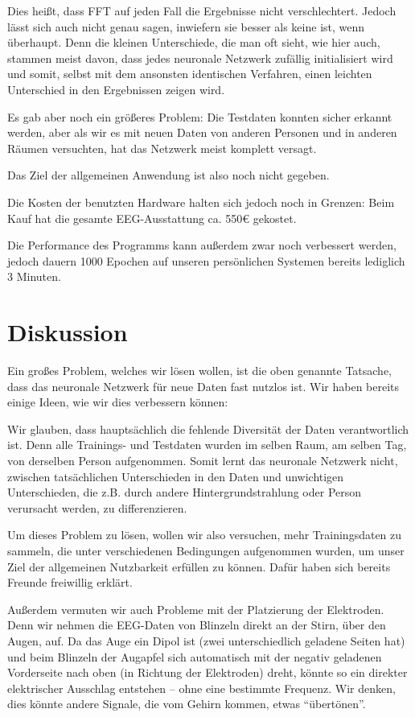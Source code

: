 \documentclass{scrartcl}
\begin{document}
	Dies heißt, dass FFT auf jeden Fall die Ergebnisse nicht verschlechtert. Jedoch lässt sich auch nicht genau sagen, inwiefern sie besser als keine ist, wenn überhaupt. Denn die kleinen Unterschiede, die man oft sieht, wie hier auch, stammen meist davon, dass jedes neuronale Netzwerk zufällig initialisiert wird und somit, selbst mit dem ansonsten identischen Verfahren, einen leichten Unterschied in den Ergebnissen zeigen wird.

	Es gab aber noch ein größeres Problem: Die Testdaten konnten sicher erkannt werden, aber als wir es mit neuen Daten von anderen Personen und in anderen Räumen versuchten, hat das Netzwerk meist komplett versagt.

	Das Ziel der allgemeinen Anwendung ist also noch nicht gegeben. 
	
	Die Kosten der benutzten Hardware halten sich jedoch noch in Grenzen: Beim Kauf hat die gesamte EEG-Ausstattung ca. 550€ gekostet.

	Die Performance des Programms kann außerdem zwar noch verbessert werden, jedoch dauern 1000 Epochen auf unseren persönlichen Systemen bereits lediglich 3 Minuten. 


	\section{Diskussion}

	Ein großes Problem, welches wir lösen wollen, ist die oben genannte Tatsache, dass das neuronale Netzwerk für neue Daten fast nutzlos ist. Wir haben bereits einige Ideen, wie wir dies verbessern können:

	Wir glauben, dass hauptsächlich die fehlende Diversität der Daten verantwortlich ist. Denn alle Trainings- und Testdaten wurden im selben Raum, am selben Tag, von derselben Person aufgenommen. Somit lernt das neuronale Netzwerk nicht, zwischen tatsächlichen Unterschieden in den Daten und unwichtigen Unterschieden, die z.B. durch andere Hintergrundstrahlung oder Person verursacht werden, zu differenzieren.

	Um dieses Problem zu lösen, wollen wir also versuchen, mehr Trainingsdaten zu sammeln, die unter verschiedenen Bedingungen aufgenommen wurden, um unser Ziel der allgemeinen Nutzbarkeit erfüllen zu können. Dafür haben sich bereits Freunde freiwillig erklärt. 

	Außerdem vermuten wir auch Probleme mit der Platzierung der Elektroden. Denn wir nehmen die EEG-Daten von Blinzeln direkt an der Stirn, über den Augen, auf. Da das Auge ein Dipol ist (zwei unterschiedlich geladene Seiten hat) und beim Blinzeln der Augapfel sich automatisch mit der negativ geladenen Vorderseite nach oben (in Richtung der Elektroden) dreht, könnte so ein direkter elektrischer Ausschlag entstehen -- ohne eine bestimmte Frequenz. Wir denken, dies könnte andere Signale, die vom Gehirn kommen, etwas \enquote{übertönen}.
\end{document}
